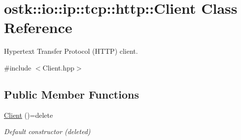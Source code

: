 \hypertarget{classostk_1_1io_1_1ip_1_1tcp_1_1http_1_1_client}{}\section{ostk\+:\+:io\+:\+:ip\+:\+:tcp\+:\+:http\+:\+:Client Class Reference}
\label{classostk_1_1io_1_1ip_1_1tcp_1_1http_1_1_client}


Hypertext Transfer Protocol (H\+T\+TP) client.  




{\ttfamily \#include $<$Client.\+hpp$>$}

\subsection*{Public Member Functions}
\begin{DoxyCompactItemize}
\item 
\hyperlink{classostk_1_1io_1_1ip_1_1tcp_1_1http_1_1_client_a2877f326d60fa80886a7b096aff767cd}{Client} ()=delete
\begin{DoxyCompactList}\small\item\em Default constructor (deleted) \end{DoxyCompactList}\end{DoxyCompactItemize}
